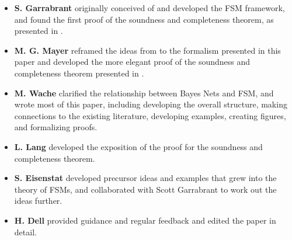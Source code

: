 \documentclass[USenglish,onecolumn]{article}
\begin{document}
\begin{itemize}
    \item \textbf{S. Garrabrant} originally conceived of and developed the FSM framework, and found the first proof of the soundness and completeness theorem, as presented in \cite{garrabrant2021temporal}.
    
     \item \textbf{M. G. Mayer} reframed the ideas from \cite{garrabrant2021temporal} to the formalism presented in this paper and developed the more elegant proof of the soundness and completeness theorem presented in .
    
    \item \textbf{M. Wache} clarified the relationship between Bayes Nets and FSM, and wrote most of this paper, including developing the overall structure, making connections to the existing literature, developing examples, creating figures, and formalizing proofs. 

    \item \textbf{L. Lang} developed the exposition of the proof for the soundness and completeness theorem.
    \item \textbf{S. Eisenstat} developed precursor ideas and examples that grew into the theory of FSMs, and collaborated with Scott Garrabrant to work out the ideas further.
    \item \textbf{H. Dell} provided guidance and regular feedback and edited the paper in detail.
\end{itemize}
\end{document}
